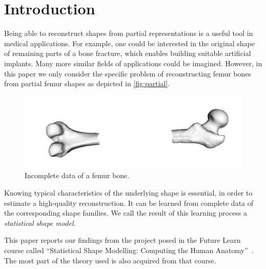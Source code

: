\section{Introduction}
\label{sec:intro}


Being able to reconstruct shapes from partial representations is a useful tool in medical applications.
For example, one could be interested in the original shape of remaining parts of a bone fracture, which enables building suitable artificial implants.
Many more similar fields of applications could be imagined.
However, in this paper we only consider the specific problem of reconstructing femur bones from partial femur shapes as depicted in \autoref{fig:partial}.
\begin{figure}[b]
	\centering
  \includegraphics[scale=.15]{./Figures/partial_femur}
  \caption{Incomplete data of a femur bone.}
  \label{fig:partial}
\end{figure}

Knowing typical characteristics of the underlying shape is essential, in order to estimate a high-quality reconstruction.
It can be learned from complete data of the corresponding shape families.
We call the result of this learning process a \emph{statistical shape model}. 

This paper reports our findings from the project posed in the Future Learn course called ``Statistical Shape Modelling: Computing the Human Anatomy''~\cite{mooc2019statistical}.
The most part of the theory used is also acquired from that course.
